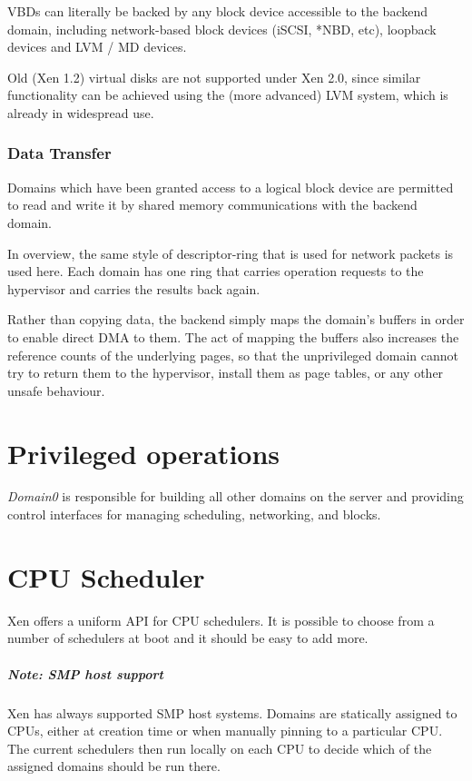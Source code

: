 \documentclass[11pt,twoside,final,openright]{xenstyle}
\begin{document}
VBDs can literally be backed by any block device accessible to the
backend domain, including network-based block devices (iSCSI, *NBD,
etc), loopback devices and LVM / MD devices.

Old (Xen 1.2) virtual disks are not supported under Xen 2.0, since
similar functionality can be achieved using the (more advanced) LVM
system, which is already in widespread use.

\subsection{Data Transfer}
Domains which have been granted access to a logical block device are permitted
to read and write it by shared memory communications with the backend domain. 

In overview, the same style of descriptor-ring that is used for
network packets is used here.  Each domain has one ring that carries
operation requests to the hypervisor and carries the results back
again.

Rather than copying data, the backend simply maps the domain's buffers
in order to enable direct DMA to them.  The act of mapping the buffers
also increases the reference counts of the underlying pages, so that
the unprivileged domain cannot try to return them to the hypervisor,
install them as page tables, or any other unsafe behaviour.

\chapter{Privileged operations}
{\it Domain0} is responsible for building all other domains on the server
and providing control interfaces for managing scheduling, networking, and
blocks.

\chapter{CPU Scheduler}

Xen offers a uniform API for CPU schedulers.  It is possible to choose
from a number of schedulers at boot and it should be easy to add more.

\paragraph*{Note: SMP host support}
Xen has always supported SMP host systems.  Domains are statically assigned to
CPUs, either at creation time or when manually pinning to a particular CPU.
The current schedulers then run locally on each CPU to decide which of the
assigned domains should be run there.
\end{document}
